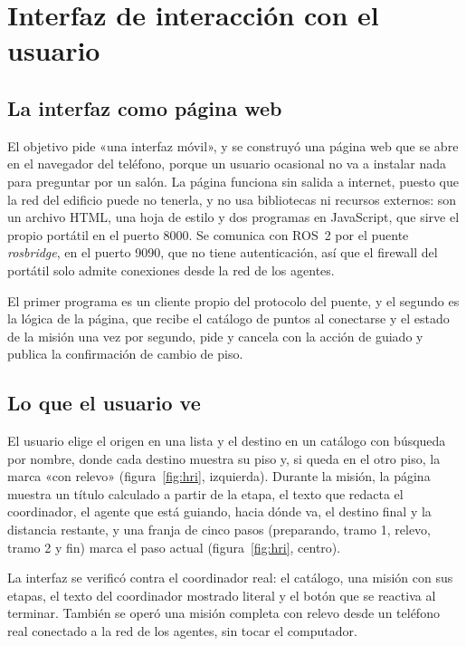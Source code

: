 \section{Interfaz de interacción con el usuario}
\label{sec:oe3}

\subsection{La interfaz como página web}

El objetivo pide «una interfaz móvil», y se construyó una página web que se abre en el navegador del teléfono, porque un usuario ocasional no va a instalar nada para preguntar por un salón. La página funciona sin
salida a internet, puesto que la red del edificio puede no tenerla, y no usa bibliotecas ni recursos externos: son un archivo HTML, una hoja de estilo y dos programas en JavaScript, que sirve el propio portátil en el puerto 8000.
Se comunica con ROS~2 por el puente \textit{rosbridge}, en el puerto 9090, que no tiene autenticación, así que el firewall del portátil solo admite conexiones desde la red de los agentes.

El primer programa es un cliente propio del protocolo del puente, y el segundo es la lógica de la página, que recibe el catálogo de puntos al conectarse y el estado de la misión una vez por segundo, pide y cancela
con la acción de guiado y publica la confirmación de cambio de piso.

\subsection{Lo que el usuario ve}

El usuario elige el origen en una lista y el destino en un catálogo con búsqueda por nombre, donde cada destino muestra su piso y, si queda en el otro piso, la marca «con relevo» (figura~\ref{fig:hri}, izquierda).
Durante la misión, la página muestra un título calculado a partir de la etapa, el texto que redacta el coordinador, el agente que está guiando, hacia dónde va, el destino final y la distancia restante, y una franja de
cinco pasos (preparando, tramo 1, relevo, tramo 2 y fin) marca el paso actual (figura~\ref{fig:hri}, centro).

La interfaz se verificó contra el coordinador real: el catálogo, una misión con sus etapas, el texto del coordinador mostrado literal y el botón que se reactiva al terminar. También se operó una misión completa con
relevo desde un teléfono real conectado a la red de los agentes, sin tocar el computador.

